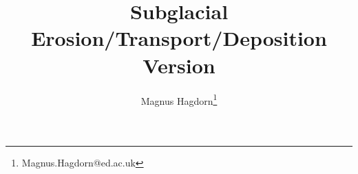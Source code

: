 \newcommand{\dir}{erosion}

\pagestyle{myheadings}


\title{Subglacial Erosion/Transport/Deposition\\Version {\erosionver}}
\author{Magnus Hagdorn\thanks{Magnus.Hagdorn@ed.ac.uk}}
\maketitle
\tableofcontents
\newpage





